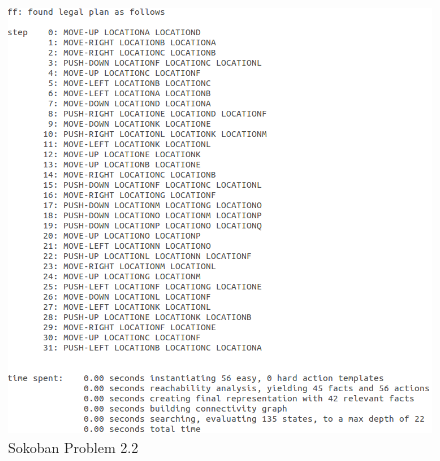 \documentclass[10pt, letter]{article}
\begin{document}
\begin{figure}[h!]
  \centering
    \includegraphics[scale = 0.4]{images/FF_Solution_p2_2}
    \caption{Sokoban Problem 2.2}
  \label{fig_prob2_2}
\end{figure}
\end{document}
